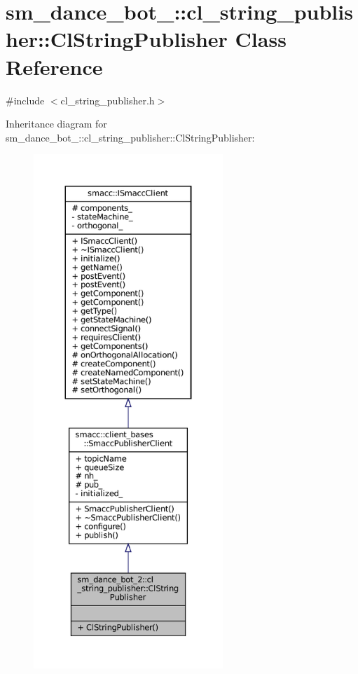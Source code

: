 \hypertarget{classsm__dance__bot__2_1_1cl__string__publisher_1_1ClStringPublisher}{}\section{sm\+\_\+dance\+\_\+bot\+\_\+:\+:cl\+\_\+string\+\_\+publisher\+:\+:Cl\+String\+Publisher Class Reference}
\label{classsm__dance__bot__2_1_1cl__string__publisher_1_1ClStringPublisher}


{\ttfamily \#include $<$cl\+\_\+string\+\_\+publisher.\+h$>$}



Inheritance diagram for sm\+\_\+dance\+\_\+bot\+\_\+:\+:cl\+\_\+string\+\_\+publisher\+:\+:Cl\+String\+Publisher\+:
\nopagebreak
\begin{figure}[H]
\begin{center}
\leavevmode
\includegraphics[height=550pt]{classsm__dance__bot__2_1_1cl__string__publisher_1_1ClStringPublisher__inherit__graph}
\end{center}
\end{figure}


